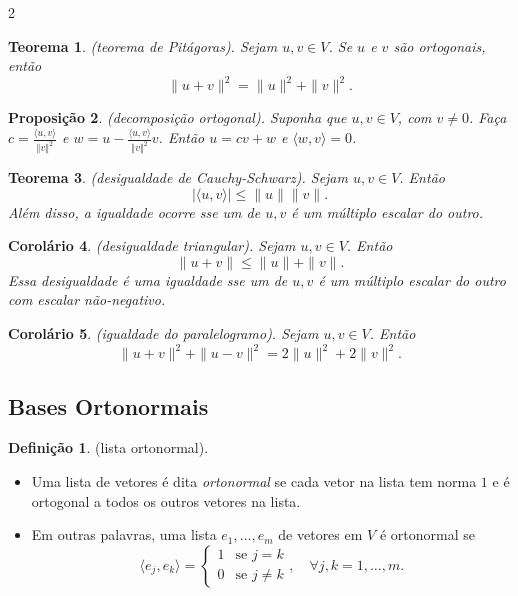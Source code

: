 \documentclass{article}
\theoremstyle{plain}
\newtheorem{thm}{Teorema}[section]
\newtheorem{prop}[thm]{Proposição}
\newtheorem{cor}[thm]{Corolário}
\theoremstyle{definition}
\newtheorem{defn}{Definição}[section]
\theoremstyle{remark}
\begin{document}
\begin{multicols}{2}
\begin{thm} (teorema de Pitágoras).
    Sejam \(u, v \in V\). Se \(u\) e \(v\) são ortogonais, então
    \[
        \|u + v\|^2 = \|u\|^2 + \|v\|^2.
    \]
\end{thm}

\begin{prop} (decomposição ortogonal).
    Suponha que \(u, v \in V\), com \(v\neq0\). Faça \(\displaystyle c=\frac{\langle u,v \rangle}{\Vert v \Vert^2}\) e \(\displaystyle w = u - \frac{\langle u,v \rangle}{\Vert v \Vert^2} v\). Então \(u = cv + w\) e \(\langle w, v \rangle = 0\).
\end{prop}

\begin{thm} (desigualdade de Cauchy-Schwarz).
    Sejam \(u, v \in V\). Então
    \begin{equation}
        |\langle u, v \rangle| \leq \|u\| \|v\|.
    \end{equation}
    \noindent Além disso, a igualdade ocorre sse um de \(u, v\) é um múltiplo escalar do outro.
\end{thm}

\begin{cor} (desigualdade triangular).
    Sejam \(u, v \in V\). Então
    \begin{equation}
        \|u + v\| \leq \|u\| + \|v\|.
    \end{equation}
    \noindent Essa desigualdade é uma igualdade sse um de \(u, v\) é um múltiplo escalar do outro com escalar não-negativo.
\end{cor}

\begin{cor} (igualdade do paralelogramo).
    Sejam \(u, v \in V\). Então
    \begin{equation}
        \|u + v\|^2 + \|u - v\|^2 = 2\|u\|^2 + 2\|v\|^2.
    \end{equation}
\end{cor}

\subsection{Bases Ortonormais}

\begin{defn} (lista ortonormal).
    \begin{itemize}
        \item Uma lista de vetores é dita \emph{ortonormal} se cada vetor na lista tem norma \(1\) e é ortogonal a todos os outros vetores na lista.
        \item Em outras palavras, uma lista \(e_1, \ldots, e_m\) de vetores em \(V\) é ortonormal se
        \[
            \langle e_j, e_k \rangle = \begin{cases}
                1 & \text{se } j = k \\
                0 & \text{se } j \neq k
            \end{cases}, \quad \forall j,k = 1,\ldots,m. 
        \]
    \end{itemize}
\end{defn}


\end{multicols}
\end{document}
